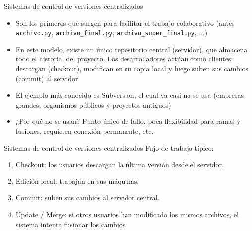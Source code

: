 \documentclass{beamer}
\begin{document}
\begin{frame}{Sistemas de control de versiones centralizados}

\begin{itemize}
    \item Son los primeros que surgen para facilitar el trabajo colaborativo (antes \texttt{archivo.py}, \texttt{archivo\_final.py}, \texttt{archivo\_super\_final.py}, ...)

    \pause

    \item En este modelo, existe un único repositorio central (servidor), que almacena todo el historial del proyecto. Los desarrolladores actúan como clientes: descargan (checkout), modifican en su copia local y luego suben sus cambios (commit) al servidor

    \pause

    
    \item El ejemplo más conocido es Subversion, el cual ya casi no se usa (empresas grandes, organismos públicos y proyectos antiguos)

    \pause

    
    \item ¿Por qué no se usan? Punto único de fallo, poca flexibilidad para ramas y fusiones, requieren conexión permanente, etc.
\end{itemize}

    
\end{frame}

\begin{frame}{Sistemas de control de versiones centralizados}
Fujo de trabajo típico:

\begin{enumerate}
    \item Checkout: los usuarios descargan la última versión desde el servidor.

\item Edición local: trabajan en sus máquinas.

\item Commit: suben sus cambios al servidor central.

\item Update / Merge: si otros usuarios han modificado los mismos archivos, el sistema intenta fusionar los cambios.
\end{enumerate}
\end{frame}
\end{document}
